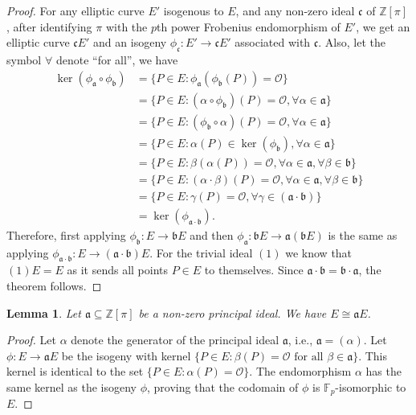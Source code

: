 \documentclass[openany, a4paper, 10pt]{book}
\theoremstyle{plain}
\theoremstyle{plain}
\theoremstyle{plain}
\newtheorem{lemma}[theorem]{Lemma}
\theoremstyle{definition}
\theoremstyle{plain}
\theoremstyle{definition}
\theoremstyle{remark}
\begin{document}
\begin{proof}
    For any elliptic curve $E'$ isogenous to $E$, and any non-zero ideal $\mathfrak c$ of $\mathbb Z[\pi]$, after identifying $\pi$ with the $p$th power Frobenius endomorphism of $E'$, we get an elliptic curve $\mathfrak cE'$ and an isogeny $\phi_{\mathfrak c}: E' \to \mathfrak cE'$ associated with $\mathfrak c$.
    Also, let the symbol $\forall$ denote ``for all'', we have
    {\allowdisplaybreaks\begin{align*}
        \ker(\phi_\mathfrak a \circ \phi_\mathfrak b)
            &= \{ P \in E: \phi_{\mathfrak a}(\phi_{\mathfrak b}(P)) = \mathcal O \} \\
            &= \{ P \in E: (\alpha \circ \phi_{\mathfrak b})(P) = \mathcal O, \forall \alpha \in \mathfrak a \} \\
            &= \{ P \in E: (\phi_{\mathfrak b} \circ \alpha)(P) = \mathcal O, \forall \alpha \in \mathfrak a \} \\
            &= \{ P \in E: \alpha(P) \in \ker (\phi_\mathfrak b), \forall \alpha \in \mathfrak a \} \\
            &= \{ P \in E: \beta(\alpha(P)) = \mathcal O, \forall \alpha \in \mathfrak a, \forall \beta \in \mathfrak b \} \\
            &= \{ P \in E: (\alpha \cdot \beta)(P) = \mathcal O, \forall \alpha \in \mathfrak a, \forall \beta \in \mathfrak b \} \\
            &= \{ P \in E: \gamma(P) = \mathcal O, \forall \gamma \in (\mathfrak a \cdot \mathfrak b) \} \\
            &= \ker(\phi_{\mathfrak a \cdot \mathfrak b}).
    \end{align*}}Therefore, first applying $\phi_\mathfrak b: E \to \mathfrak bE$ and then $\phi_\mathfrak a: \mathfrak bE \to \mathfrak a(\mathfrak bE)$ is the same as applying $\phi_{\mathfrak a \cdot \mathfrak b}: E \to (\mathfrak a \cdot \mathfrak b)E$.
    For the trivial ideal $(1)$ we know that $(1)E = E$ as it sends all points $P\in E$ to themselves.
    Since $\mathfrak a \cdot \mathfrak b = \mathfrak b \cdot \mathfrak a$, the theorem follows.
\end{proof}

\begin{lemma}\label{acting_principal_ideals}
    Let $\mathfrak a \subseteq \mathbb Z[\pi]$ be a non-zero principal ideal.
    We have $E \cong \mathfrak aE$.
\end{lemma}
\begin{proof}
    Let $\alpha$ denote the generator of the principal ideal $\mathfrak a$, i.e., $\mathfrak a = (\alpha)$.
    Let $\phi: E \to \mathfrak a E$ be the isogeny with kernel $\{ P \in E: \beta(P) = \mathcal O \text{ for all } \beta \in \mathfrak a \}$.
    This kernel is identical to the set $\{ P \in E: \alpha(P) = \mathcal O \}$.
    The endomorphism $\alpha$ has the same kernel as the isogeny $\phi$, proving that the codomain of $\phi$ is $\mathbb F_p$-isomorphic to $E$.
\end{proof}
\end{document}
